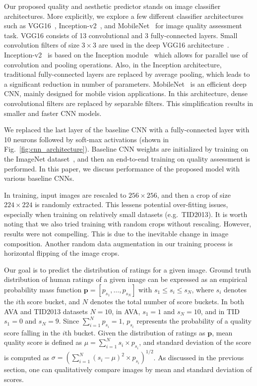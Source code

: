 \documentclass[10pt,twocolumn,twoside]{IEEEtran}
\begin{document}
Our proposed quality and aesthetic predictor stands on image classifier architectures. More explicitly, we explore a few different classifier architectures such as VGG16~\cite{simonyan2014very}, Inception-v2~\cite{szegedy2016rethinking}, and MobileNet~\cite{howard2017mobilenets} for image quality assessment task. VGG16 consists of 13 convolutional and 3 fully-connected layers. Small convolution filters of size $3\times3$ are used in the deep VGG16 architecture~\cite{simonyan2014very}. Inception-v2~\cite{szegedy2016rethinking} is based on the Inception module~\cite{ioffe2015batch} which allows for parallel use of convolution and pooling operations. Also, in the Inception architecture, traditional fully-connected layers are replaced by average pooling, which leads to a significant reduction in number of parameters. MobileNet~\cite{howard2017mobilenets} is an efficient deep CNN, mainly designed for mobile vision applications. In this architecture, dense convolutional filters are replaced by separable filters. This simplification results in smaller and faster CNN models. 

We replaced the last layer of the baseline CNN with a fully-connected layer with 10 neurons followed by soft-max activations (shown in Fig.~\ref{fig:cnn_architecture}). Baseline CNN weights are initialized by training on the ImageNet dataset~\cite{krizhevsky2012imagenet}, and then an end-to-end training on quality assessment is performed. In this paper, we discuss performance of the proposed model with various baseline CNNs.

In training, input images are rescaled to $256\times256$, and then a crop of size $224\times224$ is randomly extracted. This lessens potential over-fitting issues, especially when training on relatively small datasets (e.g.\ TID2013). It is worth noting that we also tried training with random crops without rescaling. However, results were not compelling. This is due to the inevitable change in image composition. Another random data augmentation in our training process is horizontal flipping of the image crops.

Our goal is to predict the distribution of ratings for a given image. Ground truth distribution of human ratings of a given image can be expressed as an empirical probability mass function $\textbf{p} = [p_{s_1},\ldots,p_{s_N}]$ with $s_1 \leq s_i \leq s_N$, where $s_i$ denotes the $i$th score bucket, and $N$ denotes the total number of score buckets. In both AVA and TID2013 datasets $N=10$,  in AVA, $s_1=1$ and $s_N=10$, and in TID $s_1=0$ and $s_N=9$. Since $\sum_{i=1}^{N} p_{s_i} = 1$, $p_{s_i}$ represents the probability of a quality score falling in the $i$th bucket. Given the distribution of ratings as $\textbf{p}$, mean quality score is defined as $\mu = \sum_{i=1}^{N} s_{i} \times p_{s_i}$, and standard deviation of the score is computed as $\sigma = (\sum_{i=1}^{N} (s_{i}-\mu)^2 \times p_{s_{i}})^{1/2}$. As discussed in the previous section, one can qualitatively compare images by mean and standard deviation of scores.
\end{document}
